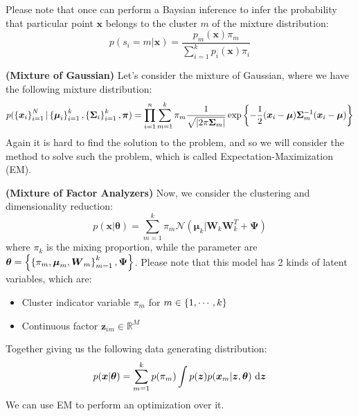\begin{remark}
    Please note that once can perform a Baysian inference to infer the probability that particular point $\boldsymbol x$ belongs to the cluster $m$ of the mixture distribution:
    \begin{equation*}
        p(s_i = m | \boldsymbol x) = \frac{p_m(\boldsymbol x)\pi_m}{\sum^k_{i=1}p_i(\boldsymbol x)\pi_i}
    \end{equation*}
\end{remark}

\begin{remark}{\textbf{(Mixture of Gaussian)}}
    Let's consider the mixture of Gaussian, where we have the following mixture distribution:
    \begin{equation*}
        p(\left\{ \boldsymbol x_i \right\}^N_{i=1} | \left\{ \boldsymbol \mu_i \right\}^k_{i=1}, \left\{ \boldsymbol \Sigma_i \right\}^k_{i=1}, \boldsymbol \pi) = \prod^n_{i=1}\sum^k_{m=1} \pi_m \frac{1}{\sqrt{\left| 2\pi\boldsymbol \Sigma_m \right|}}\exp\left\{ -\frac{1}{2}(\boldsymbol x_i-\boldsymbol \mu)\boldsymbol \Sigma_m^{-1}(\boldsymbol x_i-\boldsymbol \mu) \right\}
    \end{equation*}
    Again it is hard to find the solution to the problem, and so we will consider the method to solve such the problem, which is called Expectation-Maximization (EM). 
\end{remark}

\begin{remark}{\textbf{(Mixture of Factor Analyzers)}}
    Now, we consider the clustering and dimensionality reduction:
    \begin{equation*}
        p(\boldsymbol x | \boldsymbol \theta) = \sum^k_{m=1}\pi_m\mathcal{N}(\boldsymbol \mu_k | \boldsymbol W_k\boldsymbol W_k^T + \boldsymbol \Psi)
    \end{equation*}
    where $\pi_k$ is the mixing proportion, while the parameter are $\boldsymbol \theta = \left\{ \left\{ \pi_m, \boldsymbol \mu_m, \boldsymbol W_m \right\}^k_{m=1}, \boldsymbol \Psi \right\}$. Please note that this model has 2 kinds of latent variables, which are:
    \begin{itemize}
        \item Cluster indicator variable $\pi_m$ for $m \in \left\{ 1,\cdots,k \right\}$
        \item Continuous factor $\boldsymbol z_{im} \in \mathbb{R}^M$
    \end{itemize}
    Together giving us the following data generating distribution:
    \begin{equation*}
        p(\boldsymbol x | \boldsymbol \theta) = \sum^k_{m=1} p(\pi_m)\int p(\boldsymbol z)p(\boldsymbol x_m | \boldsymbol z, \boldsymbol \theta) \ \mathrm{d} \boldsymbol z
    \end{equation*}
    We can use EM to perform an optimization over it. 
\end{remark}

